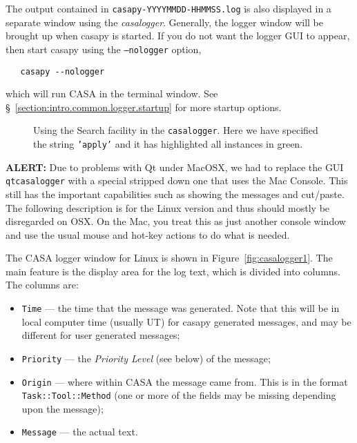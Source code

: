 The output contained in {\tt casapy-YYYYMMDD-HHMMSS.log} is also displayed in a
separate window using the {\it casalogger}.  Generally,
the logger window will be brought up when casapy is started.  If you
do not want the logger GUI to appear, then start casapy using the 
{\tt --nologger} option,
\small
\begin{verbatim}
   casapy --nologger
\end{verbatim}
\normalsize
which will run CASA in the terminal window.  See \S~\ref{section:intro.common.logger.startup}
for more startup options.


\begin{figure}[h]
\begin{center}
\caption{\label{fig:logger_search} Using the Search facility in the
{\tt casalogger}.  Here we have specified the string {\tt 'apply'}
and it has highlighted all instances in green.}
\hrulefill
\end{center}
\end{figure}

{\bf ALERT:} Due to problems with Qt under MacOSX, we had to
replace the GUI {\tt qtcasalogger} with a special stripped down one that
uses the Mac Console.  This still has the important capabilities 
such as showing the messages and cut/paste.  The following description
is for the Linux version and thus should mostly be disregarded on OSX.  On
the Mac, you treat this as just another console window and use the
usual mouse and hot-key actions to do what is needed.

The CASA logger window for Linux is shown in Figure~\ref{fig:casalogger1}.  The
main feature is the display area for the log text, which is divided
into columns.  The columns are:
\begin{itemize}
\item {\tt Time} --- the time that the message was generated.  Note
  that this will be in local computer time (usually UT) for casapy
  generated messages, and may be different for user generated messages;
\item {\tt Priority} --- the {\it Priority Level} (see below) of the
  message;
\item {\tt Origin} --- where within CASA the message came from.  This
  is in the format {\tt Task::Tool::Method} (one or more of the fields
  may be missing depending upon the message);
\item {\tt Message} --- the actual text.
\end{itemize}

